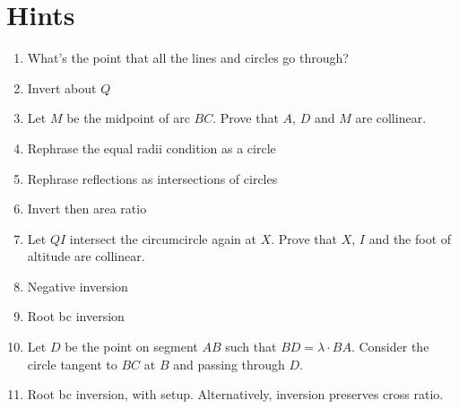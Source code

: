 \documentclass{scrartcl}
\begin{document}
\section{Hints}
\begin{enumerate}
  \item What's the point that all the lines and circles go through?
  \item Invert about $Q$
  \item Let $M$ be the midpoint of arc $BC$. Prove that $A$, $D$ and $M$
 are collinear. 
  \item Rephrase the equal radii condition as a circle
  \item Rephrase reflections as intersections of circles
  \item Invert then area ratio
  \item Let $QI$ intersect the circumcircle again at $X$. Prove that $X$, $I$ and the foot of altitude are collinear.
  \item Negative inversion
  \item Root bc inversion
  \item Let $D$ be the point on segment $AB$ such that $BD = \lambda \cdot BA$. Consider the circle tangent to $BC$ at $B$ and passing through $D$.
  \item Root bc inversion, with setup. Alternatively, inversion preserves cross ratio. 
\end{enumerate}
\end{document}
